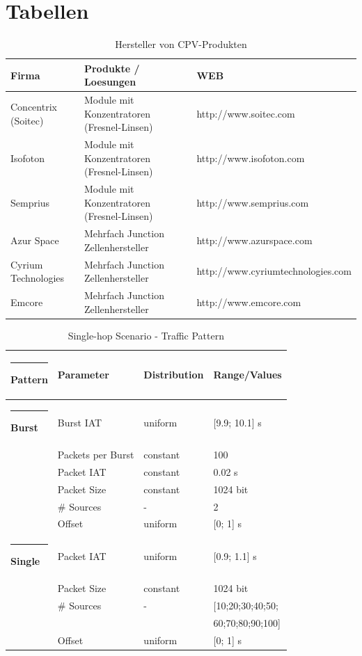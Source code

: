\documentclass{wissdoc}
\begin{document}
\section{Tabellen}
\begin{table}[htbp]
	\centering
		\begin{tabular}{|l|L{3.3 cm}|L{6.1 cm}|}
			\hline
			Firma								&			Produkte / Loesungen											&		WEB\\
			\hline
			Concentrix (Soitec)	&	Module mit Konzentratoren (Fresnel-Linsen)	&	http://www.soitec.com \\
			\hline
			Isofoton						&	Module mit Konzentratoren (Fresnel-Linsen)	&	http://www.isofoton.com \\
			\hline
			Semprius						& Module mit Konzentratoren (Fresnel-Linsen)	& http://www.semprius.com \\ 
			\hline
			\hline
			Azur Space					& Mehrfach Junction Zellenhersteller					& http://www.azurspace.com \\
			\hline
			Cyrium Technologies	& Mehrfach Junction Zellenhersteller					& \small{http://www.cyriumtechnologies.com} \\
			\hline
			Emcore							& Mehrfach Junction Zellenhersteller					& http://www.emcore.com \\
			\hline
		\end{tabular}
	\caption{Hersteller von CPV-Produkten}
	\label{tab:Hersteller}
\end{table}

\begin{table}[htb]
		\centering
		\caption{Single-hop Scenario - Traffic Pattern \label{t:traffic}}
			
		\begin{tabular}{l@{~}l@{\,\,}l@{\,\,}l} \hline \rule{-2pt}{12pt}
			Pattern& Parameter & Distribution & Range/Values  \rule{0pt}{12pt} \\ \hline \rule{-2pt}{12pt}  
      \textbf{Burst}      
      & Burst IAT         & uniform  & [9.9; 10.1] s\\ 
      & Packets per Burst & constant & 100\\
      & Packet IAT        & constant & 0.02 s\\
      & Packet Size       & constant & 1024 bit\\
      & \# Sources & -        & 2\\
			& Offset						& uniform  & [0; 1] s\\ 
      \hline      \hline\rule{-2pt}{12pt} 
      \textbf{Single}     & Packet IAT        & uniform  & [0.9; 1.1] s\\
      & Packet Size       & constant & 1024 bit\\
      & \# Sources & -        & [10;20;30;40;50;\\
      & & & 60;70;80;90;100]\\
			& Offset						& uniform  & [0; 1] s\\ 
      \hline
    \end{tabular}
\end{table}
\end{document}
